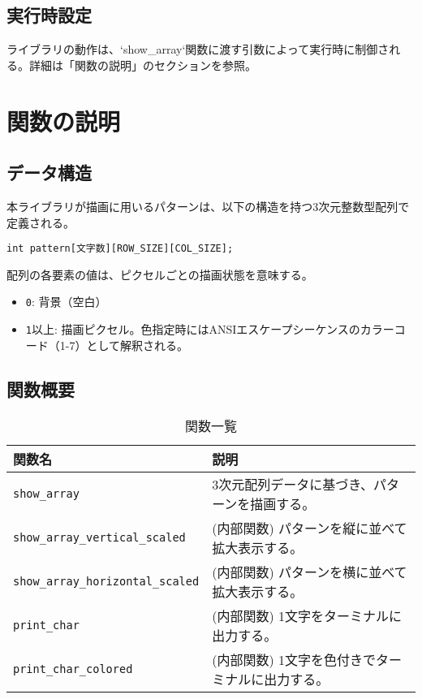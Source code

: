 \documentclass[uplatex]{jsarticle}
\begin{document}
\subsection{実行時設定}
ライブラリの動作は、`show\_array`関数に渡す引数によって実行時に制御される。詳細は「関数の説明」のセクションを参照。

\section{関数の説明}

\subsection{データ構造}
本ライブラリが描画に用いるパターンは、以下の構造を持つ3次元整数型配列で定義される。
\begin{verbatim}
int pattern[文字数][ROW_SIZE][COL_SIZE];
\end{verbatim}
配列の各要素の値は、ピクセルごとの描画状態を意味する。
\begin{itemize}
    \item \texttt{0}: 背景（空白）
    \item \texttt{1}以上: 描画ピクセル。色指定時にはANSIエスケープシーケンスのカラーコード（1-7）として解釈される。
\end{itemize}

\subsection{関数概要}
\begin{table}[H]
    \centering
    \caption{関数一覧}
    \begin{tabular}{|l|p{9cm}|}
        \hline
        \textbf{関数名} & \textbf{説明} \\ \hline
        \texttt{show\_array} & 3次元配列データに基づき、パターンを描画する。 \\ \hline
        \texttt{show\_array\_vertical\_scaled} & (内部関数) パターンを縦に並べて拡大表示する。 \\ \hline
        \texttt{show\_array\_horizontal\_scaled} & (内部関数) パターンを横に並べて拡大表示する。 \\ \hline
        \texttt{print\_char} & (内部関数) 1文字をターミナルに出力する。 \\ \hline
        \texttt{print\_char\_colored} & (内部関数) 1文字を色付きでターミナルに出力する。 \\ \hline
    \end{tabular}
\end{table}
\end{document}
